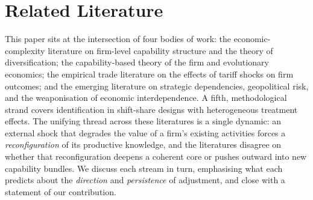 %
%
%

\section{Related Literature}
\label{sec:lit}

This paper sits at the intersection of four bodies of work: the economic-complexity
literature on firm-level capability structure and the theory of diversification; the
capability-based theory of the firm and evolutionary economics; the empirical trade
literature on the effects of tariff shocks on firm outcomes; and the emerging literature
on strategic dependencies, geopolitical risk, and the weaponisation of economic
interdependence. A fifth, methodological strand covers identification in shift-share
designs with heterogeneous treatment effects. The unifying thread across these
literatures is a single dynamic: an external shock that degrades the value of a firm's
existing activities forces a \emph{reconfiguration} of its productive knowledge, and
the literatures disagree on whether that reconfiguration deepens a coherent core or
pushes outward into new capability bundles. We discuss each stream in turn, emphasising
what each predicts about the \emph{direction} and \emph{persistence} of adjustment, and
close with a statement of our contribution.


